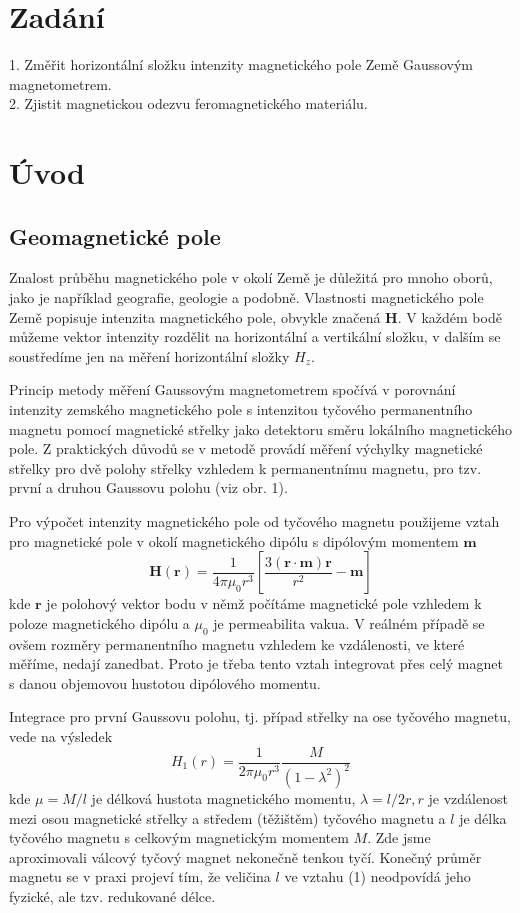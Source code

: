 \documentclass[czech,11pt,a4paper]{article}
\begin{document}
	\begin{multicols}{2}
	\section{Zadání}
	1. Změřit horizontální složku intenzity magnetického pole Země Gaussovým magnetometrem.\\
	2. Zjistit magnetickou odezvu feromagnetického materiálu.
	\section{Úvod}
	\subsection{Geomagnetické pole}
	Znalost průběhu magnetického pole v okolí Země je důležitá pro mnoho oborů, jako je například geografie, geologie a podobně. Vlastnosti magnetického pole Země popisuje intenzita magnetického pole, obvykle značená $\boldsymbol{H}$. V každém bodě můžeme vektor intenzity rozdělit na horizontální a vertikální složku, v dalším se soustředíme jen na měření horizontální složky $H_{z}$.
	
	Princip metody měření Gaussovým magnetometrem spočívá v porovnání intenzity zemského magnetického pole s intenzitou tyčového permanentního magnetu pomocí magnetické střelky jako detektoru směru lokálního magnetického pole. Z praktických důvodů se v metodě provádí měření výchylky magnetické střelky pro dvě polohy střelky vzhledem k permanentnímu magnetu, pro tzv. první a druhou Gaussovu polohu (viz obr. 1).
	
	Pro výpočet intenzity magnetického pole od tyčového magnetu použijeme vztah pro magnetické pole v okolí magnetického dipólu s dipólovým momentem $\boldsymbol{m}$
	$$
	\boldsymbol{H}(\boldsymbol{r})=\frac{1}{4 \pi \mu_{0} r^{3}}\left[\frac{3(\boldsymbol{r} \cdot \boldsymbol{m}) \boldsymbol{r}}{r^{2}}-\boldsymbol{m}\right]
	$$
	kde $\boldsymbol{r}$ je polohový vektor bodu v němž počítáme magnetické pole vzhledem k poloze magnetického dipólu a $\mu_{0}$ je permeabilita vakua. V reálném případě se ovšem rozměry permanentního magnetu vzhledem ke vzdálenosti, ve které měříme, nedají zanedbat. Proto je třeba tento vztah integrovat přes celý magnet s danou objemovou hustotou dipólového momentu.
	
	Integrace pro první Gaussovu polohu, tj. případ střelky na ose tyčového magnetu, vede na výsledek
	\begin{equation}
		H_{1}(r)  =\frac{1}{2 \pi \mu_{0} r^{3}} \frac{M}{\left(1-\lambda^{2}\right)^{2}}
	\end{equation}
	kde $\mu=M / l$ je délková hustota magnetického momentu, $\lambda=l / 2 r, r$ je vzdálenost mezi osou magnetické střelky a středem (těžištěm) tyčového magnetu a $l$ je délka tyčového magnetu s celkovým magnetickým momentem $M$. Zde jsme aproximovali válcový tyčový magnet nekonečně tenkou tyčí. Konečný průměr magnetu se v praxi projeví tím, že veličina $l$ ve vztahu (1) neodpovídá jeho fyzické, ale tzv. redukované délce. \end{multicols}
\end{document}
